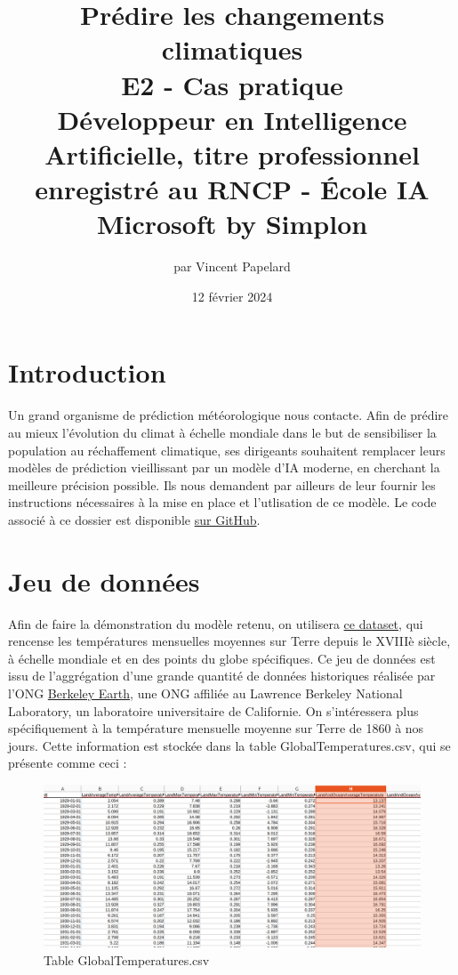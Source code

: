 \documentclass[french]{article}
\title{%
    \huge Prédire les changements climatiques  \\
    \bigskip
    \large E2 - Cas pratique \\ 
    Développeur en Intelligence Artificielle,
    titre professionnel enregistré au RNCP - École IA Microsoft by Simplon}
\date{12 février 2024}
\author{par Vincent Papelard}
\begin{document}
    \renewcommand{\contentsname}{Table des Matières}
    \maketitle
    \newpage
    \tableofcontents
    \newpage

    \section*{Introduction}
    Un grand organisme de prédiction météorologique nous contacte. Afin de prédire au mieux l'évolution du climat à échelle mondiale dans le but de sensibiliser la population au réchaffement climatique, ses dirigeants souhaitent remplacer leurs modèles de prédiction vieillissant par un modèle d'IA moderne, en cherchant la meilleure précision possible. Ils nous demandent par ailleurs de leur fournir les instructions nécessaires à la mise en place et l'utlisation de ce modèle.
    Le code associé à ce dossier est disponible \href{https://github.com/vinpap/predict_climate_change}{sur GitHub}.

    \section{Jeu de données}
    Afin de faire la démonstration du modèle retenu, on utilisera \href{https://www.kaggle.com/datasets/berkeleyearth/climate-change-earth-surface-temperature-data}{ce dataset}, qui rencense les températures mensuelles moyennes sur Terre depuis le XVIIIè siècle, à échelle mondiale et en des points du globe spécifiques. Ce jeu de données est issu de l'aggrégation d'une grande quantité de données historiques réalisée par l'ONG \href{http://berkeleyearth.org/about/}{Berkeley Earth}, une ONG affiliée au Lawrence Berkeley National Laboratory, un laboratoire universitaire de Californie.
    On s'intéressera plus spécifiquement à la température mensuelle moyenne sur Terre de 1860 à nos jours. Cette information est stockée dans la table GlobalTemperatures.csv, qui se présente comme ceci :
    
    \begin{figure}[h]
        \includegraphics[width=12cm]{dataset}
        \centering
        \caption{Table GlobalTemperatures.csv}
        \centering
    \end{figure}
\end{document}
